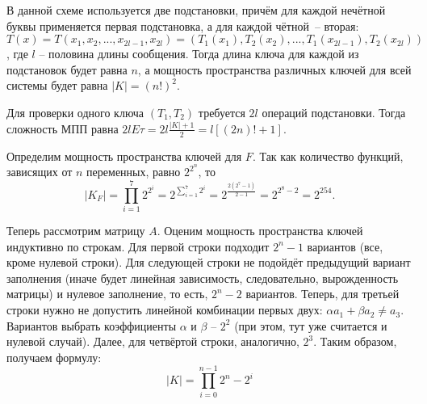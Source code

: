 \documentclass[letterpaper,11pt,openany]{book}
\begin{document}
В данной схеме используется две подстановки, причём для каждой нечётной буквы применяется первая подстановка, а для каждой чётной~-- вторая: $T(x) = T(x_1, x_2, ... , x_{2l - 1}, x_{2l}) = (T_1(x_1), T_2(x_2), ..., T_1(x_{2l - 1}), T_2(x_{2l}))$, где $l$ -- половина длины сообщения. Тогда длина ключа для каждой из подстановок будет равна $n$, а мощность пространства различных ключей для всей системы будет равна $|K| = (n!)^2$.

Для проверки одного ключа $(T_1, T_2)$ требуется $2l$ операций подстановки. Тогда сложность МПП равна $2lE\tau = 2l\frac{|K| + 1}{2} = l[(2n)! + 1]$.


Определим мощность пространства ключей для $F$. Так как количество функций, зависящих от $n$ переменных, равно $2^{2^n}$, то 
$$|K_F| = \prod_{i = 1} ^ {7} 2^{2^i} = 2 ^ {\sum_{i = 1} ^ {7} 2 ^ i} = 2 ^ { \frac{2(2^7 - 1)}{2 - 1} } = 2 ^ {2^8 - 2} = 2 ^ {254}.$$

Теперь рассмотрим матрицу $A$. Оценим мощность пространства ключей индуктивно по строкам. Для первой строки подходит $2^n - 1$ вариантов (все, кроме нулевой строки). Для следующей строки не подойдёт предыдущий вариант заполнения (иначе будет линейная зависимость, следовательно, вырожденность матрицы) и нулевое заполнение, то есть, $2^n - 2$ вариантов. Теперь, для третьей строки нужно не допустить линейной комбинации первых двух: $\alpha a_1 + \beta a_2 \ne a_3$. Вариантов выбрать коэффициенты $\alpha$ и $\beta$ -- $2^2$ (при этом, тут уже считается и нулевой случай). Далее, для четвёртой строки, аналогично, $2^3$. Таким образом, получаем формулу:
$$|K| = \prod_{i = 0} ^ {n - 1} 2^n - 2^i$$
\end{document}
